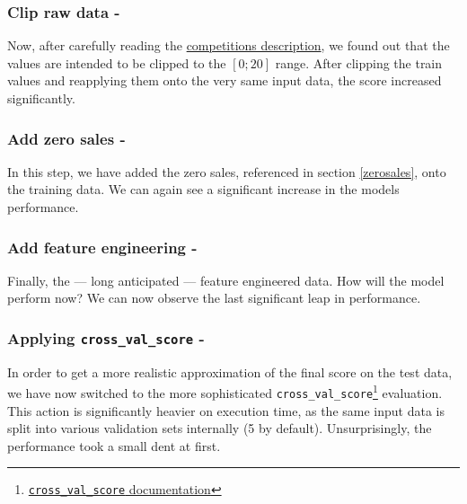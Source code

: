 \subsubsection{Clip raw data - }

Now, after carefully reading the \href{https://www.kaggle.com/c/competitive-data-science-predict-future-sales/overview/evaluation}{competitions description}, we found out that the values are intended to be clipped to the $[0;20]$ range. After clipping the train values and reapplying them onto the very same input data, the score increased significantly.

\subsubsection{Add zero sales - }

In this step, we have added the zero sales, referenced in section \ref{zerosales}, onto the training data. We can again see a significant increase in the models performance.


\subsubsection{Add feature engineering - }

Finally, the --- long anticipated --- feature engineered data. How will the model perform now? We can now observe the last significant leap in performance.

\subsubsection{Applying \texttt{cross\_val\_score} - }

In order to get a more realistic approximation of the final score on the test data, we have now switched to the more sophisticated \texttt{cross\_val\_score}\footnote{\href{https://scikit-learn.org/stable/modules/generated/sklearn.model_selection.cross_val_score.html}{\texttt{cross\_val\_score} documentation}} evaluation. This action is significantly heavier on execution time, as the same input data is split into various validation sets internally (5 by default).
Unsurprisingly, the performance took a small dent at first.

